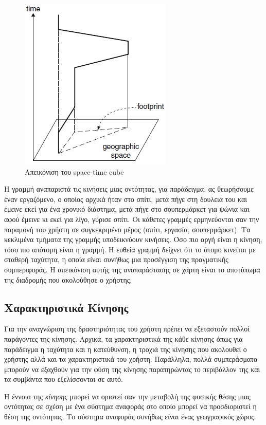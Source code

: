 \documentclass[12pt,twoside,openright]{report}
\begin{document}
\begin{figure}[H]
\centering
\includegraphics{images/space_time_cube}
\caption{Απεικόνιση του \lt space-time cube\gt \cite{giannotti2008mobility}}
\label{fig:space-timeCube}
\end{figure}

Η γραμμή αναπαριστά τις κινήσεις μιας οντότητας, για παράδειγμα, ας θεωρήσουμε έναν εργαζόμενο, ο οποίος αρχικά ήταν στο σπίτι, μετά πήγε στη δουλειά του και έμεινε εκεί για ένα χρονικό διάστημα, μετά πήγε στο σουπερμάρκετ για ψώνια και αφού έμεινε κι εκεί για λίγο, γύρισε σπίτι. Οι κάθετες γραμμές ερμηνεύονται σαν την παραμονή του χρήστη σε συγκεκριμένο μέρος (σπίτι, εργασία, σουπερμάρκετ). Τα κεκλιμένα τμήματα της γραμμής υποδεικνύουν κινήσεις. Όσο πιο αργή είναι η κίνηση, τόσο πιο απότομη είναι η γραμμή. Η ευθεία γραμμή δείχνει ότι το άτομο κινείται με σταθερή ταχύτητα, η οποία είναι συνήθως μια προσέγγιση της  πραγματικής συμπεριφοράς. Η απεικόνιση αυτής της αναπαράστασης σε χάρτη είναι το αποτύπωμα της διαδρομής που ακολούθησε ο χρήστης. 

\subsection{Χαρακτηριστικά Κίνησης}
Για την αναγνώριση της δραστηριότητας του χρήστη πρέπει να εξεταστούν πολλοί παράγοντες της κίνησης. Αρχικά, τα χαρακτηριστικά της κάθε κίνησης όπως για παράδειγμα η ταχύτητα και η κατεύθυνση, η τροχιά της κίνησης που ακολουθεί ο χρήστης αλλά και τα χαρακτηριστικά του χρήστη. Παράλληλα, πολλά συμπεράσματα μπορούν να εξαχθούν για την φύση της κίνησης παρατηρώντας το περιβάλλον της και τα συμβάντα που εξελίσσονται σε αυτό. \cite{giannotti2008mobility}

Η έννοια της \emph{κίνησης} μπορεί να οριστεί σαν την μεταβολή της φυσικής θέσης μιας οντότητας σε σχέση με ένα σύστημα αναφοράς στο οποίο μπορεί να προσδιοριστεί η θέση της οντότητας. Το σύστημα αναφοράς συνήθως είναι ένας γεωγραφικός χώρος.
\end{document}
